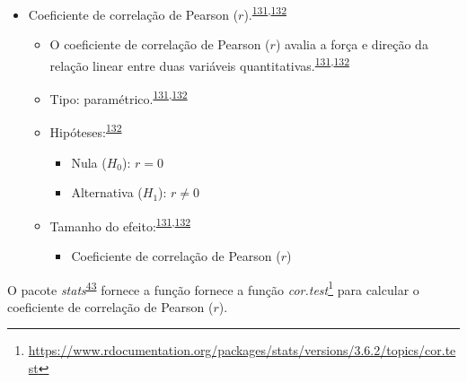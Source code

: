 \documentclass[
  a4paper,
]{book}
\providecommand{\tightlist}{%
  \setlength{\itemsep}{0pt}\setlength{\parskip}{0pt}}
\renewcommand{\href}[2]{#2\footnote{\url{#1}}}
\newenvironment{infobox}[1]
  {
  \begin{itemize}
  \renewcommand{\labelitemi}{
    \raisebox{-.7\height}[0pt][0pt]{
      {\setkeys{Gin}{width=3em,keepaspectratio}
        \texttt{[image: \#1]}}
    }
  }
  \setlength{\fboxsep}{1em}
  \begin{blackbox}
  \item
  }
  {
  \end{blackbox}
  \end{itemize}
  }
\begin{document}
\begin{itemize}
\item
  Coeficiente de correlação de Pearson (\(r\)).\textsuperscript{\protect\hyperlink{ref-khamis2008}{131},\protect\hyperlink{ref-allison2022}{132}}

  \begin{itemize}
  \item
    O coeficiente de correlação de Pearson (\(r\)) avalia a força e direção da relação linear entre duas variáveis quantitativas.\textsuperscript{\protect\hyperlink{ref-khamis2008}{131},\protect\hyperlink{ref-allison2022}{132}}
  \item
    Tipo: paramétrico.\textsuperscript{\protect\hyperlink{ref-khamis2008}{131},\protect\hyperlink{ref-allison2022}{132}}
  \item
    Hipóteses:\textsuperscript{\protect\hyperlink{ref-allison2022}{132}}

    \begin{itemize}
    \item
      Nula (\(H_{0}\)): \(r=0\)
    \item
      Alternativa (\(H_{1}\)): \(r≠0\)
    \end{itemize}
  \item
    Tamanho do efeito:\textsuperscript{\protect\hyperlink{ref-khamis2008}{131},\protect\hyperlink{ref-allison2022}{132}}

    \begin{itemize}
    \tightlist
    \item
      Coeficiente de correlação de Pearson (\(r\))
    \end{itemize}
  \end{itemize}
\end{itemize}

\begin{infobox}{images/Rlogo}
O pacote \emph{stats}\textsuperscript{\protect\hyperlink{ref-stats-2}{43}} fornece a função fornece a função \href{https://www.rdocumentation.org/packages/stats/versions/3.6.2/topics/cor.test}{\emph{cor.test}} para calcular o coeficiente de correlação de Pearson (\(r\)).

\end{infobox}
\end{document}
